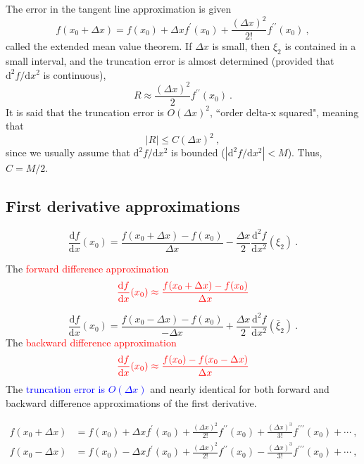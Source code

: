 \documentclass[12pt,a4paper]{article}
\newcommand{\dif}{\mathrm{d}}
\newcounter{theo}[section]\setcounter{theo}{0}
\begin{document}
The error in the tangent line approximation is given 
\begin{equation}
f(x_0 +\Delta x) = f(x_0) +\Delta x f^\prime(x_0) +\frac{(\Delta x)^2}{2!} f^{\prime\prime}(x_0) ~,
\end{equation}
called the extended mean value theorem. If $\Delta x$ is small, then $\xi_2$ is contained in a small interval, and the truncation error is almost determined (provided that $\dif^2 f/\dif x^2$ is continuous),
\begin{equation*}
R \approx \frac{(\Delta x)^2}{2} f^{\prime\prime}(x_0) ~.
\end{equation*}
It is said that the truncation error is $O(\Delta x)^2$, ``order delta-x squared", meaning that
\begin{equation*}
|R| \leqslant C(\Delta x)^2 ~,
\end{equation*}
since we usually assume that $\dif^2 f/\dif x^2$ is bounded ($|\dif^2 f/\dif x^2| < M$). Thus, $C= M/2$.

\subsection{First derivative approximations}
\begin{equation*}
\frac{\dif f}{\dif x}(x_0) = \frac{f(x_0 +\Delta x) -f(x_0)}{\Delta x} -\frac{\Delta x}{2} \frac{\dif^2 f}{\dif x^2}(\xi_2) ~.
\end{equation*}

The \textcolor{red}{forward difference approximation}
\begin{equation}
\color{red} \frac{\dif f}{\dif x}(x_0) \approx \frac{f(x_0 +\Delta x) -f(x_0)}{\Delta x} 
\end{equation}


\begin{equation*}
\frac{\dif f}{\dif x}(x_0) = \frac{f(x_0 -\Delta x) -f(x_0)}{-\Delta x} +\frac{\Delta x}{2} \frac{\dif^2 f}{\dif x^2}(\bar{\xi}_2) ~.
\end{equation*}
The \textcolor{red}{backward difference approximation}
\begin{equation}
\color{red} \frac{\dif f}{\dif x}(x_0) \approx \frac{f(x_0) -f(x_0 -\Delta x)}{\Delta x} 
\end{equation}
The \textcolor{blue}{truncation error is $O(\Delta x)$} and nearly identical for both forward and backward difference approximations of the first derivative.

\begin{align*}
f(x_0 +\Delta x) &= f(x_0) +\Delta x f^\prime(x_0) +\frac{(\Delta x)^2}{2!} f^{\prime\prime}(x_0) +\frac{(\Delta x)^3}{3!} f^{\prime\prime\prime}(x_0) + \cdots ~, \\
f(x_0 -\Delta x) &= f(x_0) -\Delta x f^\prime(x_0) +\frac{(\Delta x)^2}{2!} f^{\prime\prime}(x_0) -\frac{(\Delta x)^3}{3!} f^{\prime\prime\prime}(x_0) + \cdots ~,
\end{align*}
\end{document}

